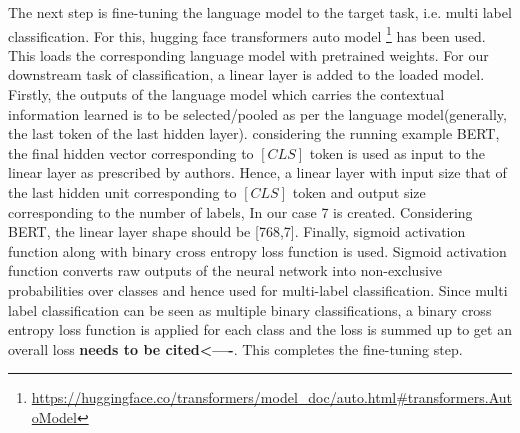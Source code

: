 The next step is fine-tuning the language model to the target task, i.e. multi label classification. For this, hugging face transformers auto model \footnote{\url{https://huggingface.co/transformers/model_doc/auto.html#transformers.AutoModel}} has been used. This loads the corresponding language model with pretrained weights. For our downstream task of classification, a linear layer is added to the loaded model. Firstly, the outputs of the language model which carries the contextual information learned is to be selected/pooled as per the language model(generally, the last token of the last hidden layer). considering the running example BERT, the final hidden vector corresponding to $[CLS]$ token is used as input to the linear layer as prescribed by authors\cite{devlin2018bert}. Hence, a linear layer with input size that of the last hidden unit corresponding to $[CLS]$ token and output size corresponding to the number of labels, In our case 7 is created. Considering BERT, the linear layer shape should be [768,7].  Finally, sigmoid activation function along with binary cross entropy loss function is used. Sigmoid activation function converts raw outputs of the neural network into non-exclusive probabilities over classes and hence used for multi-label classification. Since multi label classification can be seen as multiple binary classifications, a binary cross entropy loss function is applied for each class and the loss is summed up to get an overall loss \textbf{needs to be cited<----}. This completes the fine-tuning step.

